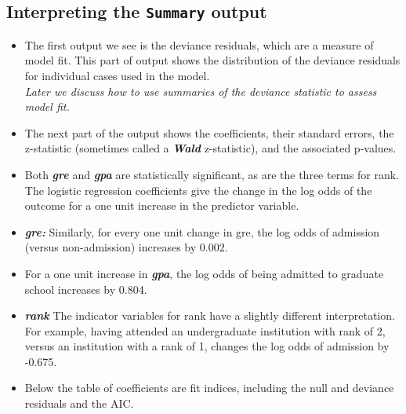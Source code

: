 \subsection{Interpreting the \texttt{Summary} output}
\begin{itemize}
\item The first output we see is the deviance residuals, which are a measure of model fit. This part of output shows the distribution of the deviance residuals for individual cases used in the model. \\ \textit{Later we discuss how to use summaries of the deviance statistic to assess model fit.}
\item The next part of the output shows the coefficients, their standard errors, the z-statistic (sometimes called a \textbf{\textit{Wald} }z-statistic), and the associated p-values. 
\item
Both \textbf{\textit{gre}} and \textbf{\textit{gpa}} are statistically significant, as are the three terms for rank. The logistic regression coefficients give the change in the log odds of the outcome for a one unit increase in the predictor variable.
\item \textbf{\textit{gre:}} Similarly, for every one unit change in gre, the log odds of admission (versus non-admission) increases by 0.002.
\item 
For a one unit increase in \textbf{\textit{gpa}}, the log odds of being admitted to graduate school increases by 0.804.
\item \textbf{\textit{rank}}
The indicator variables for rank have a slightly different interpretation. For example, having attended an undergraduate institution with rank of 2, versus an institution with a rank of 1, changes the log odds of admission by -0.675.
\item Below the table of coefficients are fit indices, including the null and deviance residuals and the AIC.
\end{itemize}
